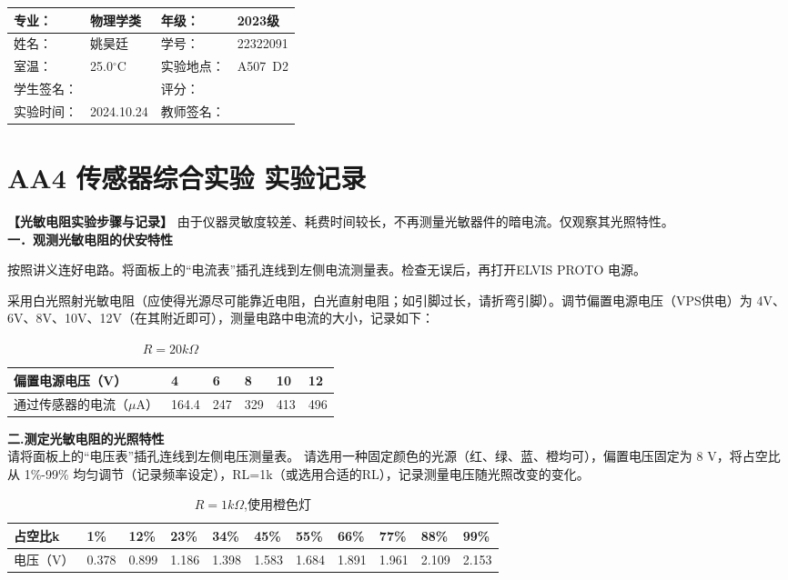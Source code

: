 \documentclass[dvipsnames, svgnames,a4paper,11pt]{article}
\begin{document}
\clearpage
{}
\begin{table}
	\renewcommand\arraystretch{1.7}
	\centering
	\begin{tabularx}{\textwidth}{|X|X|X|X|}
	\hline
	专业：& 物理学类 &年级：& 2023级 \\
	\hline
	姓名：& 姚昊廷 &学号：&22322091  \\
	\hline
	室温：&25.0$^\circ$C&实验地点：&A507\ D2\\
	\hline
	学生签名：& & 评分： &\\
	\hline
	实验时间：& 2024.10.24& 教师签名：&\\
	\hline
	\end{tabularx}
\end{table}

\section{AA4 传感器综合实验 \textbf{实验记录}}
\textbf{【光敏电阻实验步骤与记录】}
由于仪器灵敏度较差、耗费时间较长，不再测量光敏器件的暗电流。仅观察其光照特性。\\
\textbf{一．观测光敏电阻的伏安特性}

按照讲义连好电路。将面板上的“电流表”插孔连线到左侧电流测量表。检查无误后，再打开ELVIS PROTO 电源。

采用白光照射光敏电阻（应使得光源尽可能靠近电阻，白光直射电阻；如引脚过长，请折弯引脚）。调节偏置电源电压（VPS供电）为 4V、6V、8V、10V、12V（在其附近即可），测量电路中电流的大小，记录如下：
\begin{table}[htbp]
	\renewcommand\arraystretch{1.7}
	\centering
    \caption{$R=20k\Omega$}
	\begin{tabularx}{\textwidth}{|X|X|X|X|X|X|}
	\hline
	偏置电源电压（V）&4 &6& 8&10&12\\
	\hline
	通过传感器的电流（$\mu$A）& 164.4 &247&329&413&496  \\
	\hline
	\end{tabularx}
\end{table}

\textbf{二.测定光敏电阻的光照特性}\\
请将面板上的“电压表”插孔连线到左侧电压测量表。
请选用一种固定颜色的光源（红、绿、蓝、橙均可），偏置电压固定为 8 V，将占空比从 1\%-99\% 均匀调节（记录频率设定），RL=1k（或选用合适的RL），记录测量电压随光照改变的变化。
\begin{table}[H]
	\renewcommand\arraystretch{1.7}
	\centering
    \caption{$R=1k\Omega$,使用橙色灯}
	\begin{tabularx}{\textwidth}{|X|X|X|X|X|X|X|X|X|X|X|}
	\hline
	占空比k&1\% &12\%& 23\%&34\%&45\%&55\%&66\%&77\%&88\%&99\%\\
	\hline
	电压（V）&0.378&0.899&1.186&1.398&1.583&1.684&1.891&1.961&2.109&2.153  \\
	\hline
	\end{tabularx}
\end{table}
\end{document}
